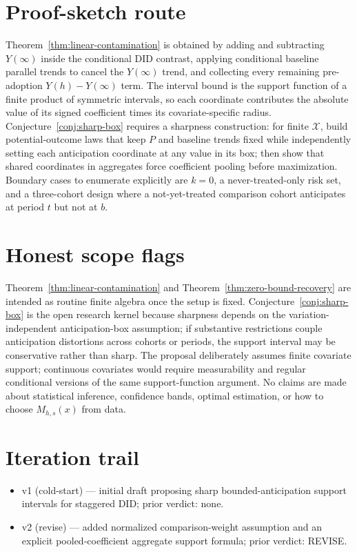 \documentclass[11pt]{article}
\theoremstyle{definition}
\theoremstyle{plain}
\theoremstyle{remark}
\begin{document}
\section{Proof-sketch route}
Theorem~\ref{thm:linear-contamination} is obtained by adding and subtracting \(Y(\infty)\) inside the conditional DID contrast, applying conditional baseline parallel trends to cancel the \(Y(\infty)\) trend, and collecting every remaining pre-adoption \(Y(h)-Y(\infty)\) term.  The interval bound is the support function of a finite product of symmetric intervals, so each coordinate contributes the absolute value of its signed coefficient times its covariate-specific radius.  Conjecture~\ref{conj:sharp-box} requires a sharpness construction: for finite \(\mathcal{X}\), build potential-outcome laws that keep \(P\) and baseline trends fixed while independently setting each anticipation coordinate at any value in its box; then show that shared coordinates in aggregates force coefficient pooling before maximization.  Boundary cases to enumerate explicitly are \(k=0\), a never-treated-only risk set, and a three-cohort design where a not-yet-treated comparison cohort anticipates at period \(t\) but not at \(b\).

\section{Honest scope flags}
Theorem~\ref{thm:linear-contamination} and Theorem~\ref{thm:zero-bound-recovery} are intended as routine finite algebra once the setup is fixed.  Conjecture~\ref{conj:sharp-box} is the open research kernel because sharpness depends on the variation-independent anticipation-box assumption; if substantive restrictions couple anticipation distortions across cohorts or periods, the support interval may be conservative rather than sharp.  The proposal deliberately assumes finite covariate support; continuous covariates would require measurability and regular conditional versions of the same support-function argument.  No claims are made about statistical inference, confidence bands, optimal estimation, or how to choose \(M_{h,s}(x)\) from data.

\section{Iteration trail}
\begin{itemize}[leftmargin=*]
\item v1 (cold-start) --- initial draft proposing sharp bounded-anticipation support intervals for staggered DID; prior verdict: none.
\item v2 (revise) --- added normalized comparison-weight assumption and an explicit pooled-coefficient aggregate support formula; prior verdict: REVISE.
\end{itemize}
\end{document}
